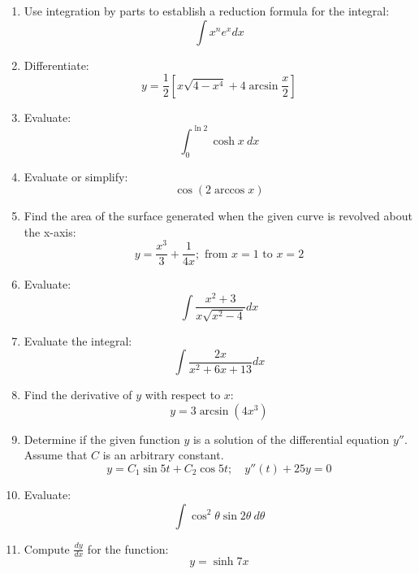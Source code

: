 \documentclass[fleqn]{article}
\begin{document}
\begin{multicols}{2}
\begin{enumerate}
\item Use integration by parts to establish a reduction formula for the integral:
\[\int x^n e^x dx\]

\item Differentiate:
\[y=\frac{1}{2}\left[x\sqrt{4-x^4}+4\arcsin\frac{x}{2}\right]\]

\item Evaluate:
\[\int_0^{\ln 2}\cosh x\ dx\]

\item Evaluate or simplify:
\[\cos(2\arccos x)\]

\item Find the area of the surface generated when the given curve is revolved about the x-axis:
\[y=\frac{x^3}{3}+\frac{1}{4x};\text{ from }x=1\text{ to }x=2\]

\item Evaluate:
\[\int\frac{x^2+3}{x\sqrt{x^2-4}}dx\]

\item Evaluate the integral:
\[\int\frac{2x}{x^2+6x+13}dx\]

\item Find the derivative of \(y\) with respect to \(x\):
\[y=3\arcsin(4x^3)\]

\item Determine if the given function \(y\) is a solution of the differential equation \(y''\). Assume that \(C\) is an arbitrary constant.
\[y=C_1\sin 5t+C_2\cos 5t;\quad y''(t)+25y=0\]

\item Evaluate:
\[\int\cos^2\theta\sin 2\theta\ d\theta\]

\item Compute \(\frac{dy}{dx}\) for the function:
\[y=\sinh 7x\]

\end{enumerate}
\end{multicols}
\end{document}
